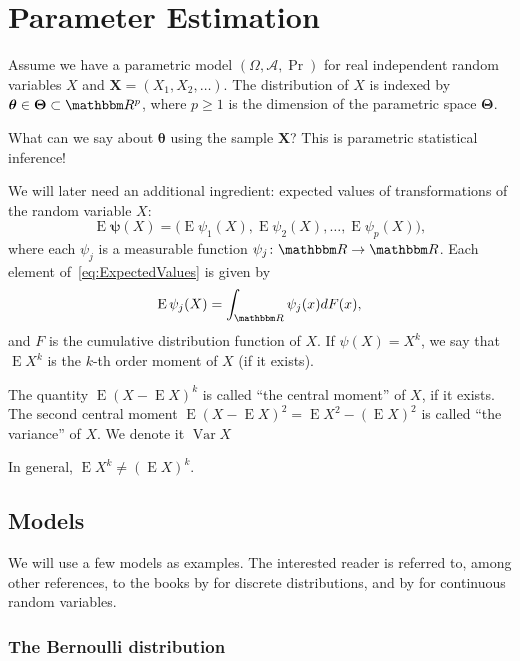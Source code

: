 \chapter{Parameter Estimation}\label{Chapter:ParameterEstimation}

Assume we have a parametric model $(\Omega, \mathcal A, \Pr)$ for real independent random  variables $X$ and $\bm X = (X_1,X_2,\dots)$.
The distribution of $X$ is indexed by $\bm \theta\in\bm \Theta\subset \mathbbm R^p$, where $p\geq 1$ is the dimension of the parametric space $\bm \Theta$.

What can we say about $\bm \theta$ using the sample $\bm X$?
This is parametric statistical inference!

We will later need an additional ingredient: expected values of transformations of the random variable $X$:
\begin{equation}
\operatorname{E}\bm\psi(X) = \big(
\operatorname{E}\psi_1(X), \operatorname{E}\psi_2(X), \dots, \operatorname{E}\psi_p(X)
\big),
\label{eq:ExpectedValues}
\end{equation}
where each $\psi_j$ is a measurable function $\psi_j\colon \mathbbm R\to\mathbbm R$.
Each element of~\eqref{eq:ExpectedValues} is given by
\begin{equation}
\operatorname{E}\psi_j(X) = 
	\int_{\mathbbm R} \psi_j(x) dF(x),
\end{equation}
and $F$ is the cumulative distribution function of $X$.
If $\psi(X)=X^k$, we say that $\operatorname{E}X^k$ is the $k$-th order moment of $X$ (if it exists).

The quantity $\operatorname{E}(X-\operatorname{E}X)^k$ is called ``the central moment'' of $X$, if it exists.
The second central moment $\operatorname{E}(X-\operatorname{E}X)^2 = \operatorname{E}X^2-(\operatorname{E}X)^2$ is called ``the variance'' of $X$.
We denote it $\operatorname{Var}X$

In general, $\operatorname{E}X^k\neq (\operatorname{E}X)^k$.

\section{Models}

We will use a few models as examples.
The interested reader is referred to, among other references, to the books by \citet{johnson_discrete} for discrete distributions, and by \citet{johnson_continuous2} for continuous random variables.

\subsection{The Bernoulli distribution}\label{Sec:Bernoulli}

